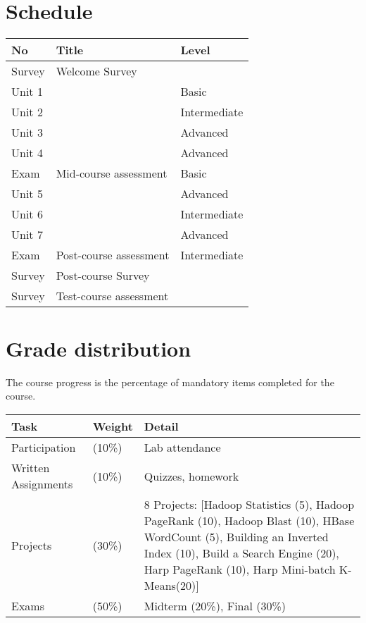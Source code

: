 \FILENAME\

\section{Schedule}
\begin{center}
  \begin{tabular}{|l|l|l|}
    \hline
    No & Title & Level \\
    \hline
    Survey 
    &          Welcome Survey
    &          ~ \\
    \hline
    Unit 1 & \nameref{sec:icloud-fundamentals} & Basic \\
    \hline 
    Unit 2 & \nameref{sec:icloud-iaas} & Intermediate \\
    \hline
    Unit 3 & \nameref{sec:icloud-mapreduce} & Advanced \\
    \hline
    Unit 4 & \nameref{sec:icloud-iterative-mapreduce} & Advanced \\
    \hline
    Exam & Mid-course assessment & Basic \\
    \hline
    Unit 5 & \nameref{sec:icloud-nosql} & Advanced \\
    \hline
    Unit 6 & \nameref{sec:icloud-iot}  & Intermediate \\
    \hline
    Unit 7 & \nameref{sec:icloud-saas} & Advanced \\
    \hline
    Exam & Post-course assessment & Intermediate \\
    \hline
    Survey & Post-course Survey  & ~ \\
    \hline
    Survey & Test-course assessment & ~ \\
    \hline
  \end{tabular}
\end{center}

\section{Grade distribution}
The course progress is the percentage of mandatory items completed for the course.

\begin{center}
  \begin{tabular}{|l|l|p{5cm}|}
    \hline
    Task & Weight & Detail \\
    \hline
    Participation & (10\%) & Lab attendance \\
    \hline
    Written Assignments & (10\%) & Quizzes, homework \\
    \hline
    Projects & (30\%) & 8 Projects: [Hadoop Statistics (5), Hadoop PageRank (10), Hadoop Blast (10), HBase WordCount (5), Building an Inverted Index (10), Build a Search Engine (20), Harp PageRank (10), Harp Mini-batch K-Means(20)] \\
    \hline
    Exams & (50\%) & Midterm (20\%), Final (30\%)  \\
    \hline
  \end{tabular}
\end{center}


